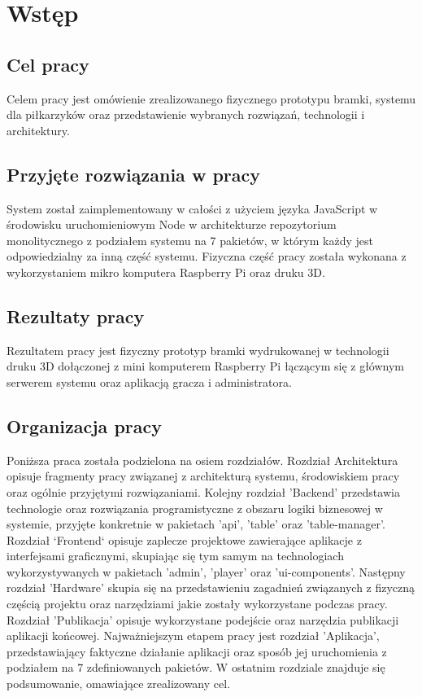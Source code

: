 \chapter{Wstęp}
\label{ch:funplenop}

\section{Cel pracy}
Celem pracy jest omówienie zrealizowanego fizycznego prototypu bramki, systemu dla piłkarzyków oraz przedstawienie wybranych rozwiązań, technologii \newline i architektury.

\section{Przyjęte rozwiązania w pracy}
System został zaimplementowany w całości z użyciem języka JavaScript w środowisku uruchomieniowym Node w architekturze repozytorium monolitycznego z podziałem systemu na 7 pakietów, w którym każdy jest odpowiedzialny za inną część systemu. Fizyczna część pracy została wykonana z wykorzystaniem mikro komputera Raspberry Pi oraz druku 3D.

\section{Rezultaty pracy}
Rezultatem pracy jest fizyczny prototyp bramki wydrukowanej w technologii druku 3D dołączonej z mini komputerem Raspberry Pi łączącym się z głównym serwerem systemu oraz aplikacją gracza i administratora.

\section{Organizacja pracy}
Poniższa praca została podzielona na osiem rozdziałów. Rozdział Architektura opisuje fragmenty pracy związanej z architekturą systemu, środowiskiem pracy oraz ogólnie przyjętymi rozwiązaniami. 
Kolejny rozdział 'Backend' przedstawia technologie oraz rozwiązania programistyczne z obszaru logiki biznesowej w systemie, przyjęte konkretnie w pakietach 'api', 'table' oraz 'table-manager'.
Rozdział `Frontend` opisuje zaplecze projektowe zawierające aplikacje z interfejsami graficznymi, skupiając się tym samym na technologiach wykorzystywanych w pakietach 'admin', 'player' oraz 'ui-components'.
Następny rozdział 'Hardware' skupia się na przedstawieniu zagadnień związanych z fizyczną częścią projektu oraz narzędziami jakie zostały wykorzystane podczas pracy.
Rozdział 'Publikacja' opisuje wykorzystane podejście oraz narzędzia publikacji aplikacji końcowej.
Najważniejszym etapem pracy jest rozdział 'Aplikacja', przedstawiający faktyczne działanie aplikacji oraz sposób jej uruchomienia z podziałem na 7 zdefiniowanych pakietów.
W ostatnim rozdziale znajduje się podsumowanie, omawiające zrealizowany cel.
